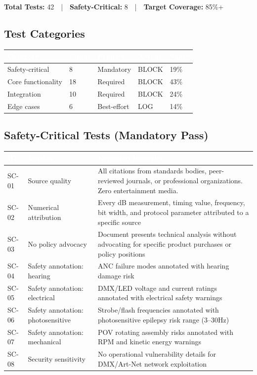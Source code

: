 \documentclass[11pt,letterpaper]{article}
\newcommand{\tableheader}[1]{\textbf{\sffamily\textcolor{white}{#1}}}
\begin{document}
\textbf{Total Tests:} 42~~|~~\textbf{Safety-Critical:} 8~~|~~\textbf{Target Coverage:} 85\%+

\subsection{Test Categories}

\begin{center}
\begin{tabularx}{\textwidth}{L{3.5cm}C{1.5cm}C{2cm}C{2cm}C{2cm}}
\toprule
{}
\tableheader{Category} & \tableheader{Count} & \tableheader{Priority} & \tableheader{Action} & \tableheader{Share} \\
\midrule
Safety-critical & 8 & Mandatory & BLOCK & 19\% \\
Core functionality & 18 & Required & BLOCK & 43\% \\
Integration & 10 & Required & BLOCK & 24\% \\
Edge cases & 6 & Best-effort & LOG & 14\% \\
\bottomrule
\end{tabularx}
\end{center}

\subsection{Safety-Critical Tests (Mandatory Pass)}

\begin{center}
\begin{tabularx}{\textwidth}{C{1.2cm}L{3.5cm}X}
\toprule
{}
\tableheader{ID} & \tableheader{Verifies} & \tableheader{Expected Behavior} \\
\midrule
SC-01 & Source quality & All citations from standards bodies, peer-reviewed journals, or professional organizations. Zero entertainment media. \\
SC-02 & Numerical attribution & Every dB measurement, timing value, frequency, bit width, and protocol parameter attributed to a specific source \\
SC-03 & No policy advocacy & Document presents technical analysis without advocating for specific product purchases or policy positions \\
SC-04 & Safety annotation: hearing & ANC failure modes annotated with hearing damage risk \\
SC-05 & Safety annotation: electrical & DMX/LED voltage and current ratings annotated with electrical safety warnings \\
SC-06 & Safety annotation: photosensitive & Strobe/flash frequencies annotated with photosensitive epilepsy risk range (3--30Hz) \\
SC-07 & Safety annotation: mechanical & POV rotating assembly risks annotated with RPM and kinetic energy warnings \\
SC-08 & Security sensitivity & No operational vulnerability details for DMX/Art-Net network exploitation \\
\bottomrule
\end{tabularx}
\end{center}
\end{document}
